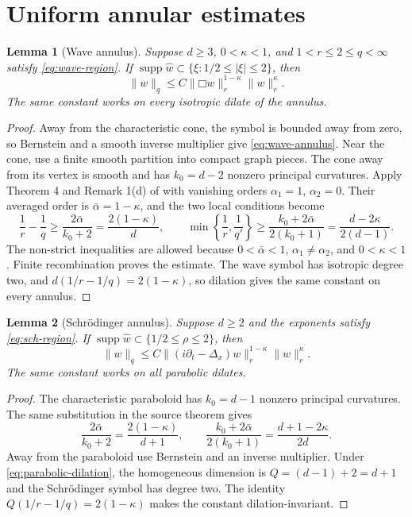 \documentclass[11pt]{article}
\newtheorem{lemma}{Lemma}
\newcommand{\Boxop}{\mathord\Box}
\begin{document}
\section{Uniform annular estimates}

\begin{lemma}[Wave annulus]\label{lem:wave-annulus}
Suppose $d\ge3$, $0<\kappa<1$, and $1<r\le2\le q<\infty$ satisfy
\eqref{eq:wave-region}.  If
$\operatorname{supp}\widehat w\subset\{\xi:1/2\le|\xi|\le2\}$, then
\begin{equation}\label{eq:wave-annulus}
 \|w\|_q\le C\|\Boxop w\|_r^{1-\kappa}\|w\|_r^\kappa.
\end{equation}
The same constant works on every isotropic dilate of the annulus.
\end{lemma}

\begin{proof}
Away from the characteristic cone, the symbol is bounded away from zero, so
Bernstein and a smooth inverse multiplier give \eqref{eq:wave-annulus}.
Near the cone, use a finite smooth partition into compact graph pieces.  The
cone away from its vertex is smooth and has $k_0=d-2$ nonzero principal
curvatures.  Apply Theorem 4 and Remark 1(d) of \cite{Mandel} with vanishing
orders $\alpha_1=1$, $\alpha_2=0$.  Their averaged order is
$\bar\alpha=1-\kappa$, and the two local conditions become
\[
 \frac1r-\frac1q\ge\frac{2\bar\alpha}{k_0+2}
 =\frac{2(1-\kappa)}d,
 \qquad
 \min\left\{\frac1r,\frac1{q'}\right\}
 \ge\frac{k_0+2\bar\alpha}{2(k_0+1)}
 =\frac{d-2\kappa}{2(d-1)}.
\]
The non-strict inequalities are allowed because
$0<\bar\alpha<1$, $\alpha_1\ne\alpha_2$, and $0<\kappa<1$.
Finite recombination proves the estimate.  The wave symbol has isotropic
degree two, and $d(1/r-1/q)=2(1-\kappa)$, so dilation gives the same constant
on every annulus.
\end{proof}

\begin{lemma}[Schr\"odinger annulus]\label{lem:sch-annulus}
Suppose $d\ge2$ and the exponents satisfy \eqref{eq:sch-region}.  If
$\operatorname{supp}\widehat w\subset\{1/2\le\rho\le2\}$, then
\begin{equation}\label{eq:sch-annulus}
 \|w\|_q\le C\|(i\partial_t-\Delta_x)w\|_r^{1-\kappa}
                  \|w\|_r^\kappa.
\end{equation}
The same constant works on all parabolic dilates.
\end{lemma}

\begin{proof}
The characteristic paraboloid has $k_0=d-1$ nonzero principal curvatures.
The same substitution in the source theorem gives
\[
 \frac{2\bar\alpha}{k_0+2}=\frac{2(1-\kappa)}{d+1},
 \qquad
 \frac{k_0+2\bar\alpha}{2(k_0+1)}
 =\frac{d+1-2\kappa}{2d}.
\]
Away from the paraboloid use Bernstein and an inverse multiplier.  Under
\eqref{eq:parabolic-dilation}, the homogeneous dimension is
$Q=(d-1)+2=d+1$ and the Schr\"odinger symbol has degree two.  The identity
$Q(1/r-1/q)=2(1-\kappa)$ makes the constant dilation-invariant.
\end{proof}
\end{document}
